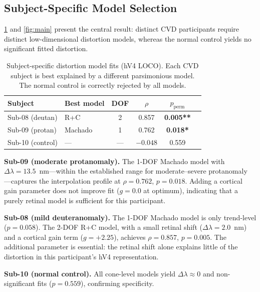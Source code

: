 \documentclass{article}
\begin{document}
\subsection{Subject-Specific Model Selection}

\cref{tab:main} and \cref{fig:main} present the central result: distinct CVD participants require distinct low-dimensional distortion models, whereas the normal control yields no significant fitted distortion.

\begin{table}[t]
  \caption{Subject-specific distortion model fits (hV4 LOCO). Each CVD subject is best explained by a different parsimonious model. The normal control is correctly rejected by all models.}
  \label{tab:main}
  \begin{center}
    \begin{small}
      \begin{tabular}{llcccc}
        \toprule
        Subject & Best model & DOF & $\rho$ & $p_{\text{perm}}$ \\
        \midrule
        Sub-08 (deutan) & R+C & 2 & 0.857 & \textbf{0.005**} \\
        Sub-09 (protan) & Machado & 1 & 0.762 & \textbf{0.018*} \\
        Sub-10 (control) & --- & --- & $-0.048$ & 0.559 \\
        \bottomrule
      \end{tabular}
    \end{small}
  \end{center}
  \vskip -0.15in
\end{table}

\textbf{Sub-09 (moderate protanomaly).}
The 1-DOF Machado model with $\Delta\lambda = 13.5$~nm---within the established range for moderate--severe protanomaly \citep{machado2009}---captures the interpolation profile at $\rho = 0.762$, $p = 0.018$.
Adding a cortical gain parameter does not improve fit ($g = 0.0$ at optimum), indicating that a purely retinal model is sufficient for this participant.

\textbf{Sub-08 (mild deuteranomaly).}
The 1-DOF Machado model is only trend-level ($p = 0.058$).
The 2-DOF R+C model, with a small retinal shift ($\Delta\lambda = 2.0$~nm) and a cortical gain term ($g = +2.25$), achieves $\rho = 0.857$, $p = 0.005$.
The additional parameter is essential: the retinal shift alone explains little of the distortion in this participant's hV4 representation.

\textbf{Sub-10 (normal control).}
All cone-level models yield $\Delta\lambda \approx 0$ and non-significant fits ($p = 0.559$), confirming specificity.
\end{document}
